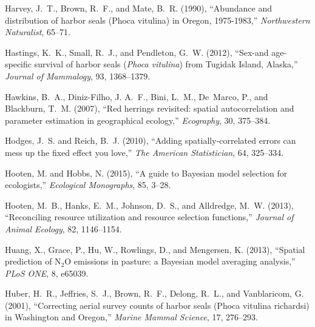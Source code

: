 \documentclass[11pt, titlepage]{article}\usepackage[]{graphicx}\usepackage[]{color}
\begin{document}
\begin{spacing}{1.9}
\begin{flushleft}
\begin{thebibliography}{126}
Harvey, J.~T., Brown, R.~F., and Mate, B.~R. (1990), \enquote{Abundance and
  distribution of harbor seals (Phoca vitulina) in Oregon, 1975-1983,}
  \textit{Northwestern Naturalist}, 65--71.

Hastings, K.~K., Small, R.~J., and Pendleton, G.~W. (2012), \enquote{Sex-and
  age-specific survival of harbor seals (\emph{{P}hoca vitulina}) from
  {T}ugidak {I}sland, {A}laska,} \textit{Journal of Mammalogy}, 93, 1368--1379.

Hawkins, B.~A., Diniz-Filho, J. A.~F., Bini, L.~M., De~Marco, P., and
  Blackburn, T.~M. (2007), \enquote{Red herrings revisited: spatial
  autocorrelation and parameter estimation in geographical ecology,}
  \textit{Ecography}, 30, 375--384.

Hodges, J.~S. and Reich, B.~J. (2010), \enquote{Adding spatially-correlated
  errors can mess up the fixed effect you love,} \textit{The American
  Statistician}, 64, 325--334.

Hooten, M. and Hobbs, N. (2015), \enquote{A guide to Bayesian model selection
  for ecologists,} \textit{Ecological Monographs}, 85, 3--28.

Hooten, M.~B., Hanks, E.~M., Johnson, D.~S., and Alldredge, M.~W. (2013),
  \enquote{Reconciling resource utilization and resource selection functions,}
  \textit{Journal of Animal Ecology}, 82, 1146--1154.

Huang, X., Grace, P., Hu, W., Rowlings, D., and Mengersen, K. (2013),
  \enquote{Spatial prediction of N$_2$O emissions in pasture: a Bayesian model
  averaging analysis,} \textit{PLoS ONE}, 8, e65039.

Huber, H.~R., Jeffries, S.~J., Brown, R.~F., Delong, R.~L., and Vanblaricom, G.
  (2001), \enquote{Correcting aerial survey counts of harbor seals (Phoca
  vitulina richardsi) in Washington and Oregon,} \textit{Marine Mammal
  Science}, 17, 276--293.


\end{thebibliography}
\end{flushleft}
\end{spacing}
\end{document}

